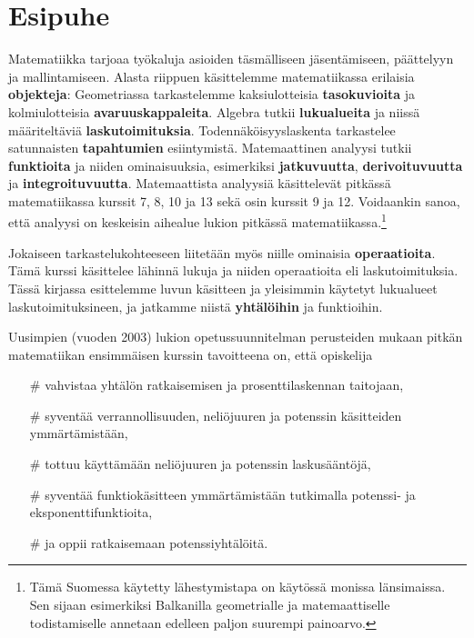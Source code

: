 
\chapter{Esipuhe}



Matematiikka tarjoaa työkaluja asioiden täsmälliseen jäsentämiseen, päättelyyn ja mallintamiseen. Alasta riippuen käsittelemme matematiikassa erilaisia \textbf{objekteja}: Geometriassa tarkastelemme kaksiulotteisia \textbf{tasokuvioita} ja kolmiulotteisia \textbf{avaruuskappaleita}. Algebra tutkii \textbf{lukualueita} ja niissä määriteltäviä \textbf{laskutoimituksia}. Todennäköisyyslaskenta tarkastelee satunnaisten \textbf{tapahtumien} esiintymistä. Matemaattinen analyysi tutkii \textbf{funktioita} ja niiden ominaisuuksia, esimerkiksi \textbf{jatkuvuutta}, \textbf{derivoituvuutta} ja \textbf{integroituvuutta}. Matemaattista analyysiä käsittelevät pitkässä matematiikassa kurssit 7, 8, 10 ja 13 sekä osin kurssit 9 ja 12. Voidaankin sanoa, että analyysi on keskeisin aihealue lukion pitkässä matematiikassa.\footnote[1]{Tämä Suomessa käytetty lähestymistapa on käytössä monissa länsimaissa. Sen sijaan esimerkiksi Balkanilla geometrialle ja matemaattiselle todistamiselle annetaan edelleen paljon suurempi painoarvo.}

Jokaiseen tarkastelukohteeseen liitetään myös niille ominaisia \textbf{operaatioita}. Tämä kurssi käsittelee lähinnä lukuja ja niiden operaatioita eli laskutoimituksia. Tässä kirjassa esittelemme luvun käsitteen ja yleisimmin käytetyt lukualueet laskutoimituksineen, ja jatkamme niistä \textbf{yhtälöihin} ja funktioihin.

Uusimpien (vuoden 2003) lukion opetussuunnitelman perusteiden mukaan pitkän matematiikan ensimmäisen kurssin tavoitteena on, että opiskelija
\begin{itemize}
\item[\#] vahvistaa yhtälön ratkaisemisen ja prosenttilaskennan taitojaan,
\item[\#] syventää verrannollisuuden, neliöjuuren ja potenssin käsitteiden ymmärtämistään,
\item[\#] tottuu käyttämään neliöjuuren ja potenssin laskusääntöjä,
\item[\#] syventää funktiokäsitteen ymmärtämistään tutkimalla potenssi- ja eksponenttifunktioita,
\item[\#] ja oppii ratkaisemaan potenssiyhtälöitä.
\end{itemize}

